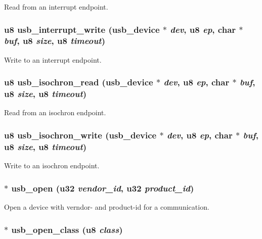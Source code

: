 Read from an interrupt endpoint. 
\subsubsection{\setlength{\rightskip}{0pt plus 5cm}u8 usb\_\-interrupt\_\-write ({\bf usb\_\-device} $\ast$ {\em dev}, u8 {\em ep}, char $\ast$ {\em buf}, u8 {\em size}, u8 {\em timeout})}\label{usb_8c_edc58dd17762672f7254cbe05ef7f135}


Write to an interrupt endpoint. 
\subsubsection{\setlength{\rightskip}{0pt plus 5cm}u8 usb\_\-isochron\_\-read ({\bf usb\_\-device} $\ast$ {\em dev}, u8 {\em ep}, char $\ast$ {\em buf}, u8 {\em size}, u8 {\em timeout})}\label{usb_8c_2764be421f5db3fe7546ef8d591f39e5}


Read from an isochron endpoint. 
\subsubsection{\setlength{\rightskip}{0pt plus 5cm}u8 usb\_\-isochron\_\-write ({\bf usb\_\-device} $\ast$ {\em dev}, u8 {\em ep}, char $\ast$ {\em buf}, u8 {\em size}, u8 {\em timeout})}\label{usb_8c_c36bbab7df127d7d2076bc04b3a12a40}


Write to an isochron endpoint. 
\subsubsection{$\ast$ usb\_\-open (u32 {\em vendor\_\-id}, u32 {\em product\_\-id})}\label{usb_8c_b1ab8d31ba6bf15352c1b62500f7ec7d}


Open a device with verndor- and product-id for a communication. 
\subsubsection{$\ast$ usb\_\-open\_\-class (u8 {\em class})}\label{usb_8c_52c2bd3e63f3188fba38052e833f5afd}


